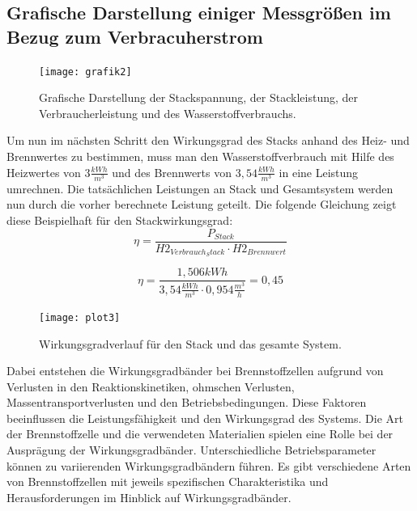 \subsection{Grafische Darstellung einiger Messgrößen im Bezug zum Verbracuherstrom}
\begin{figure}[H]
    \centering
    \texttt{[image: grafik2]}
    \caption{Grafische Darstellung der Stackspannung, der
    Stackleistung, der Verbraucherleistung und des Wasserstoffverbrauchs.}
    \label{fig:plot2_26062023}
  \end{figure}
  Um nun im nächsten Schritt den Wirkungsgrad des Stacks anhand des Heiz- und Brennwertes zu bestimmen, muss man den Wasserstoffverbrauch mit Hilfe des Heizwertes von $3 \frac{kWh}{m^3}$ und des Brennwerts von $3,54 \frac{kWh}{m^3}$ in eine Leistung umrechnen. Die tatsächlichen Leistungen an Stack und Gesamtsystem werden nun durch die vorher berechnete Leistung geteilt. Die folgende Gleichung zeigt diese Beispielhaft für den Stackwirkungsgrad:
\begin{equation}
 \eta= \frac{P_{Stack}}{H2_{Verbrauch_Stack}\cdot H2_{Brennwert}}
  \label{eq:230627_Beispiel_wirkungsgrad_Berechnung}
\end{equation}

$$\eta= \frac{1,506 kWh}{3,54 \frac{kWh}{m^3 }\cdot 0,954 \frac{m^3}{h}}=0,45$$

\begin{figure}[H]
    \centering
    \texttt{[image: plot3]}
    \caption{Wirkungsgradverlauf für den Stack und das gesamte System.}
    \label{fig:plot3_26062023}
  \end{figure}
  Dabei entstehen die Wirkungsgradbänder bei Brennstoffzellen aufgrund von Verlusten in den Reaktionskinetiken, ohmschen Verlusten, Massentransportverlusten und den Betriebsbedingungen. Diese Faktoren beeinflussen die Leistungsfähigkeit und den Wirkungsgrad des Systems.
   Die Art der Brennstoffzelle und die verwendeten Materialien spielen eine Rolle bei der Ausprägung der Wirkungsgradbänder. Unterschiedliche Betriebsparameter können zu variierenden Wirkungsgradbändern führen. Es gibt verschiedene Arten von Brennstoffzellen mit jeweils spezifischen Charakteristika und Herausforderungen im Hinblick auf Wirkungsgradbänder.
